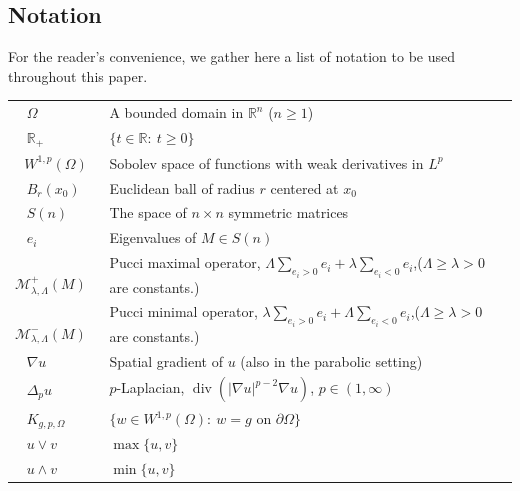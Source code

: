 \documentclass[11pt,oneside,english]{amsart}
\numberwithin{equation}{section}
\theoremstyle{plain}
\numberwithin{equation}{section}
\begin{document}
\subsection{Notation}\label{sec:notation1}

For the reader's convenience, we gather here a list of notation to be used throughout this paper.



\begin{longtable}[l]{l l}

\,\,\,\,\,$\Omega$ &\qquad A bounded  domain  in $\mathbb{R}^n$ ($n\geq 1$) \\[2mm]

\,\,\,\,\,$\mathbb{R}_+$ &\qquad $\{t\in\mathbb{R}:\ t\ge0\}$ \\[2mm]
\,\,\,\,$W^{1,p}(\Omega)$ &\qquad Sobolev space of functions with weak derivatives in $L^p$ \\[2mm]
\,\,\,\,\,$B_r(x_0)$ &\qquad Euclidean ball of radius $r$ centered at $x_0$ \\[2mm]
\,\,\,\,\,$S(n)$ &\qquad The space of $n\times n$ symmetric matrices \\[2mm]
\,\,\,\,\,$e_i$&\qquad Eigenvalues of $M\in S(n)$\\[2mm]

\,\,\,\,\,$\mathcal{M}^+_{\lambda,\Lambda}(M)$ &\qquad Pucci maximal operator, $\displaystyle \Lambda \sum_{e_i > 0} e_i + \lambda \sum_{e_i < 0} e_i$,\quad($\Lambda\geq\lambda> 0$ are constants.)  \\[2mm]

\,\,\,\,\,$\mathcal{M}^-_{\lambda,\Lambda}(M)$ &\qquad Pucci minimal operator,  $\displaystyle \lambda \sum_{e_i > 0} e_i + \Lambda \sum_{e_i < 0} e_i$,\quad ($\Lambda\geq\lambda> 0$ are constants.) \\[2mm]

\,\,\,\,\,$\nabla u$ &\qquad Spatial gradient of $u$ (also in the parabolic setting) \\[2mm]
\,\,\,\,\,$\Delta_p u$ &\qquad  $p$-Laplacian, $\operatorname{div}(|\nabla u|^{p-2}\nabla u)$, $p\in(1,\infty)$ \\[2mm]

\,\,\,\,\,$K_{g,p,\Omega}$ &\qquad $\{w\in W^{1,p}(\Omega):\ w=g \text{ on }\partial\Omega\}$ \\[2mm]

\,\,\,\,\,$u\vee v$ &\qquad $\max\{u,v\}$ \\[2mm]

\,\,\,\,\,$u\wedge v$ &\qquad $\min\{u,v\}$ \\[2mm]


\end{longtable}
\end{document}
